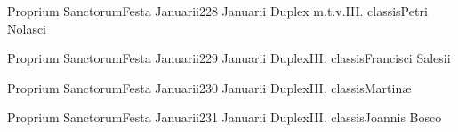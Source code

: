 \documentclass[liber-responsorialis_sanctorale.tex]{subfiles}
\begin{document}
	{Proprium Sanctorum}{Festa Januarii}{2}{28 Januarii}
	{Duplex m.t.v.}{III. classis}{Petri Nolasci}
	{\conprubric}
	{\respdetemp}

	{Proprium Sanctorum}{Festa Januarii}{2}{29 Januarii}
	{Duplex}{III. classis}{Francisci Salesii}
	{\copodorubric}
	{\respdetemp}

	{Proprium Sanctorum}{Festa Januarii}{2}{30 Januarii}
	{Duplex}{III. classis}{Martinæ}
	{\vmrubric}
	{\respdetemp}

	{Proprium Sanctorum}{Festa Januarii}{2}{31 Januarii}
	{Duplex}{III. classis}{Joannis Bosco}
	{\conprubric}
	{\respdetemp}
\end{document}
